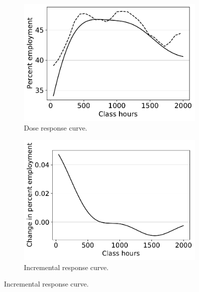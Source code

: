 \begin{figure}[ht]
\begin{centering}
     \begin{subfigure}[b]{0.45\textwidth}
         \centering
         \includegraphics[width=\textwidth]{img/ATE_JCdata_d_filter_with_dml_bma.pdf}
         \caption{Dose response curve.}
     \end{subfigure}
     \hfill
     \begin{subfigure}[b]{0.45\textwidth}
         \centering
         \includegraphics[width=\textwidth]{img/Incremental_ATE_JCdata_d_filter_bma.pdf}
         \caption{Incremental response curve.}
     \end{subfigure}

\end{centering}
\end{figure}
